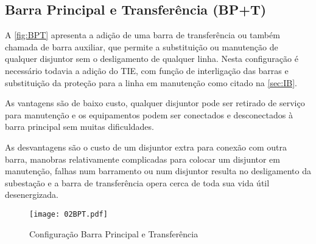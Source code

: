 		\subsection{Barra Principal e Transferência (BP+T)} \label{sec:BPT}
			A \autoref{fig:BPT} apresenta a adição de uma barra de transferência ou também chamada de barra auxiliar, que permite a substituição ou manutenção de qualquer disjuntor sem o desligamento de qualquer linha. Nesta configuração é necessário todavia a adição do TIE, com função de interligação das barras e substituição da proteção para a linha em manutenção como citado na \autoref{sec:IB}.\par
			As vantagens são de baixo custo, qualquer disjuntor pode ser retirado de serviço para manutenção e os equipamentos podem ser conectados e desconectados à barra principal sem muitas dificuldades.\par
			As desvantagens são o custo de um disjuntor extra para conexão com outra barra, manobras relativamente complicadas para colocar um disjuntor em manutenção, falhas num barramento ou num disjuntor resulta no desligamento da subestação e a barra de transferência opera cerca de toda sua vida útil desenergizada.\par
			\begin{figure}[!htb]
				\caption{Configuração Barra Principal e Transferência}
				\centering
				\texttt{[image: 02BPT.pdf]}
				\label{fig:BPT}
				\end{figure}
